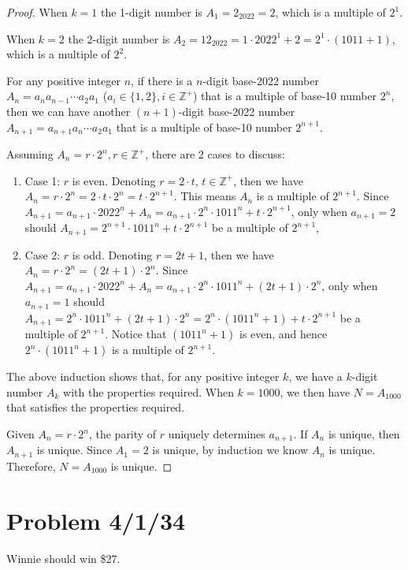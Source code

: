 \documentclass[11pt, oneside]{article}   	%
\begin{document}
\begin{proof}
When $k=1$ the 1-digit number is $A_1=2_{2022} = 2$, which is a multiple of $2^1$. 

When $k=2$ the 2-digit number is $A_2=12_{2022}=1\cdot2022^1+2=2^1\cdot (1011+1)$, which is a multiple of $2^2$.

For any positive integer $n$, if there is a $n$-digit base-2022 number $A_n=a_n a_{n-1} \cdots a_2 a_1$ ($a_i \in \{1, 2\}, i \in \mathbb{Z^+}$) that is a multiple of base-10 number $2^n$, then we can have another $(n+1)$-digit base-2022 number $A_{n+1}=a_{n+1} a_n \cdots a_2 a_1$ that is a multiple of base-10 number $2^{n+1}$.

Assuming $A_n=r\cdot 2^n, r \in \mathbb{Z^+}$, there are 2 cases to discuss: 
\begin{enumerate}
\item Case 1: $r$ is even. Denoting $r=2\cdot t$, $t\in \mathbb{Z^+}$, then we have $A_n=r\cdot 2^n= 2\cdot t\cdot 2^n= t\cdot 2^{n+1}$. This means $A_n$ is a multiple of $2^{n+1}$. Since $A_{n+1}=a_{n+1}\cdot 2022^n+A_n=a_{n+1}\cdot 2^n\cdot 1011^n + t\cdot 2^{n+1}$, only when $a_{n+1}=2$ should $A_{n+1} = 2^{n+1}\cdot 1011^n + t\cdot 2^{n+1}$ be a multiple of $2^{n+1}$, 

\item Case 2: $r$ is odd. Denoting $r=2t+1$, then we have $A_n=r\cdot 2^n=(2t+1)\cdot 2^n $. Since $A_{n+1}=a_{n+1}\cdot 2022^n+A_n=a_{n+1}\cdot 2^n\cdot 1011^n+(2t+1)\cdot2^n$, only when $a_{n+1}=1$ should $A_{n+1}=2^n\cdot 1011^n+(2t+1)\cdot 2^n=2^n\cdot(1011^n+1)+t\cdot 2^{n+1}$ be a multiple of $2^{n+1}$. Notice that $(1011^n+1)$ is even, and hence $2^n\cdot(1011^n+1)$ is a multiple of $2^{n+1}$.
\end{enumerate} 

The above induction shows that, for any positive integer $k$, we have a $k$-digit number $A_k$ with the properties required. When $k=1000$, we then have $N=A_1000$ that satisfies the properties required.

Given $A_n=r\cdot 2^n$, the parity of $r$ uniquely determines $a_{n+1}$. If $A_n$ is unique, then $A_{n+1}$ is unique. Since $A_1=2$ is unique, by induction we know $A_n$ is unique. Therefore, $N=A_{1000}$ is unique.

\end{proof}

\newpage
\section{Problem 4/1/34}
Winnie should win \$27. 
\end{document}
